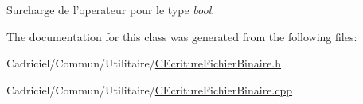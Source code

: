 Surcharge de l'operateur pour le type {\itshape bool}. 



The documentation for this class was generated from the following files\-:\begin{DoxyCompactItemize}
\item 
Cadriciel/\-Commun/\-Utilitaire/\hyperlink{_c_ecriture_fichier_binaire_8h}{C\-Ecriture\-Fichier\-Binaire.\-h}\item 
Cadriciel/\-Commun/\-Utilitaire/\hyperlink{_c_ecriture_fichier_binaire_8cpp}{C\-Ecriture\-Fichier\-Binaire.\-cpp}\end{DoxyCompactItemize}
